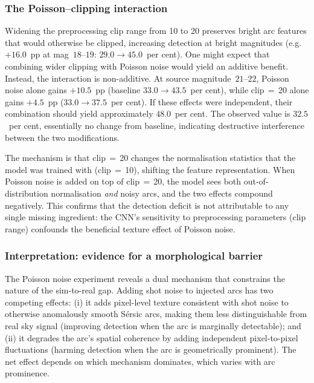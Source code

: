 \documentclass[fleqn,usenatbib]{mnras}
\begin{document}
\subsubsection{The Poisson--clipping interaction}

Widening the preprocessing clip range from 10 to 20 preserves bright arc features that would otherwise be clipped, increasing detection at bright magnitudes (e.g.\ $+16.0$~pp at mag~$18$--$19$: $29.0 \to 45.0$~per cent).  One might expect that combining wider clipping with Poisson noise would yield an additive benefit.  Instead, the interaction is non-additive.  At source magnitude~$21$--$22$, Poisson noise alone gains $+10.5$~pp (baseline $33.0 \to 43.5$~per cent), while clip$\,=\,$20 alone gains $+4.5$~pp ($33.0 \to 37.5$~per cent).  If these effects were independent, their combination should yield approximately $48.0$~per cent.  The observed value is $32.5$~per cent, essentially no change from baseline, indicating destructive interference between the two modifications.

The mechanism is that clip$\,=\,$20 changes the normalisation statistics that the model was trained with (clip$\,=\,$10), shifting the feature representation.  When Poisson noise is added on top of clip$\,=\,$20, the model sees both out-of-distribution normalisation \emph{and} noisy arcs, and the two effects compound negatively.  This confirms that the detection deficit is not attributable to any single missing ingredient: the CNN's sensitivity to preprocessing parameters (clip range) confounds the beneficial texture effect of Poisson noise.


\subsubsection{Interpretation: evidence for a morphological barrier}

The Poisson noise experiment reveals a dual mechanism that constrains the nature of the sim-to-real gap.  Adding shot noise to injected arcs has two competing effects: (i) it adds pixel-level texture consistent with shot noise to otherwise anomalously smooth S\'{e}rsic arcs, making them less distinguishable from real sky signal (improving detection when the arc is marginally detectable); and (ii) it degrades the arc's spatial coherence by adding independent pixel-to-pixel fluctuations (harming detection when the arc is geometrically prominent).  The net effect depends on which mechanism dominates, which varies with arc prominence.
\end{document}
